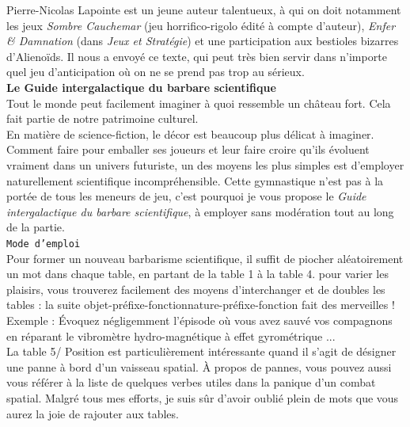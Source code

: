 \documentclass[11pt,twoside,a4paper]{article}
\begin{document}
\begin{multicols}{3}
\small{

Pierre-Nicolas Lapointe est un jeune auteur talentueux, {\`a} qui on doit notamment les jeux \emph{Sombre Cauchemar} (jeu horrifico-rigolo {\'e}dit{\'e} {\`a} compte d'auteur), \emph{Enfer \& Damnation} (dans \emph{Jeux et Strat{\'e}gie}) et une participation aux bestioles bizarres d'Alieno{\"i}ds. Il nous a envoy{\'e} ce texte, qui peut tr{\`e}s bien servir dans n'importe quel jeu d'anticipation o{\`u} on ne se prend pas trop au s{\'e}rieux.~\\

\textbf{Le Guide intergalactique du barbare scientifique}~\\

Tout le monde peut facilement imaginer {\`a} quoi ressemble un ch{\^a}teau fort. Cela fait partie de notre patrimoine culturel.~\\

En mati{\`e}re de science-fiction, le d{\'e}cor est beaucoup plus d{\'e}licat {\`a} imaginer. Comment faire pour emballer ses joueurs et leur faire croire qu'ils {\'e}voluent vraiment dans un univers futuriste, un des moyens les plus simples est d'employer naturellement scientifique incompr{\'e}hensible. Cette gymnastique n'est pas {\`a} la port{\'e}e de tous les meneurs de jeu, c'est pourquoi je vous propose le \emph{Guide intergalactique du barbare scientifique}, {\`a} employer sans mod{\'e}ration tout au long de la partie.~\\

\texttt{Mode d'emploi}~\\
Pour former un nouveau barbarisme scientifique, il suffit de piocher al{\'e}atoirement un mot dans chaque table, en partant de la table 1 {\`a} la table 4. pour varier les plaisirs, vous trouverez facilement des moyens d'interchanger et de doubles les tables : la suite objet-pr{\'e}fixe-fonctionnature-pr{\'e}fixe-fonction fait des merveilles ! Exemple : {\'E}voquez n{\'e}gligemment l'{\'e}pisode o{\`u} vous avez sauv{\'e} vos compagnons en r{\'e}parant le vibrom{\`e}tre hydro-magn{\'e}tique {\`a} effet gyrom{\'e}trique ...~\\

La table 5/ Position est particuli{\`e}rement int{\'e}ressante quand il s'agit de d{\'e}signer une panne {\`a} bord d'un vaisseau spatial. {\`A} propos de pannes, vous pouvez aussi vous r{\'e}f{\'e}rer {\`a} la liste de quelques verbes utiles dans la panique d'un combat spatial. Malgr{\'e} tous mes efforts, je suis s{\^u}r d'avoir oubli{\'e} plein de mots que vous aurez la joie de rajouter aux tables.~\\

}
\end{multicols}
\end{document}
